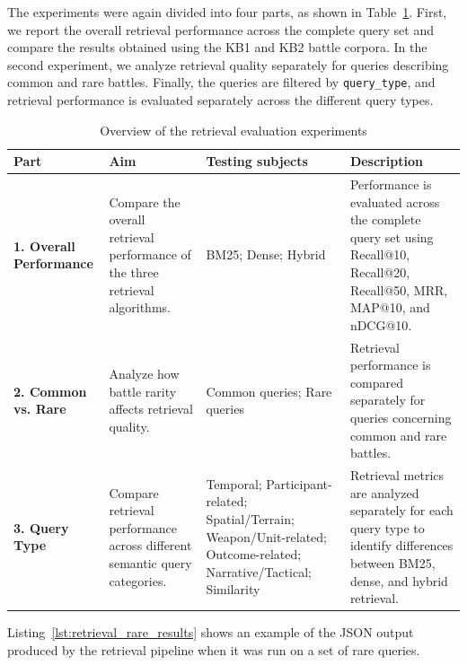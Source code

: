 The experiments were again divided into four parts, as shown in Table~\ref{tab:retrieval_experiment_parts}. First, we report the overall retrieval performance across the complete query set and compare the results obtained using the KB1 and KB2 battle corpora. In the second experiment, we analyze retrieval quality separately for queries describing common and rare battles. Finally, the queries are filtered by \texttt{query\_type}, and retrieval performance is evaluated separately across the different query types.
\begin{table}[htbp]
    \centering
    \caption{Overview of the retrieval evaluation experiments}
    \label{tab:retrieval_experiment_parts}

    \small
    \renewcommand{\arraystretch}{1.5}
    \setlength{\tabcolsep}{4pt}

    \begin{tabular}{
        >{\raggedright\arraybackslash}p{}
        >{\raggedright\arraybackslash}p{}
        >{\raggedright\arraybackslash}p{}
        >{\raggedright\arraybackslash}p{}
    }
        \toprule
        \textbf{Part} &
        \textbf{Aim} &
        \textbf{Testing subjects} &
        \textbf{Description} \\
        \midrule

        \textbf{1. Overall Performance} &
        Compare the overall retrieval performance of
        the three retrieval algorithms. &
        BM25; Dense; Hybrid &
        Performance is evaluated across the complete query
        set using Recall@10, Recall@20, Recall@50, MRR,
        MAP@10, and nDCG@10. \\
        \midrule

        \textbf{2. Common vs. Rare} &
        Analyze how battle rarity affects retrieval quality. &
        Common queries; Rare queries &
        Retrieval performance is compared separately for
        queries concerning common and rare battles. \\
        \midrule

        \textbf{3. Query Type} &
        Compare retrieval performance across different
        semantic query categories. &
        Temporal; Participant-related; Spatial/Terrain;
        Weapon/Unit-related; Outcome-related;
        Narrative/Tactical; Similarity &
        Retrieval metrics are analyzed separately for each
        query type to identify differences between BM25,
        dense, and hybrid retrieval. \\

        \bottomrule
    \end{tabular}
\end{table}
Listing~\ref{lst:retrieval_rare_results} shows an example of the JSON output produced by the retrieval pipeline when it was run on a set of rare queries.

